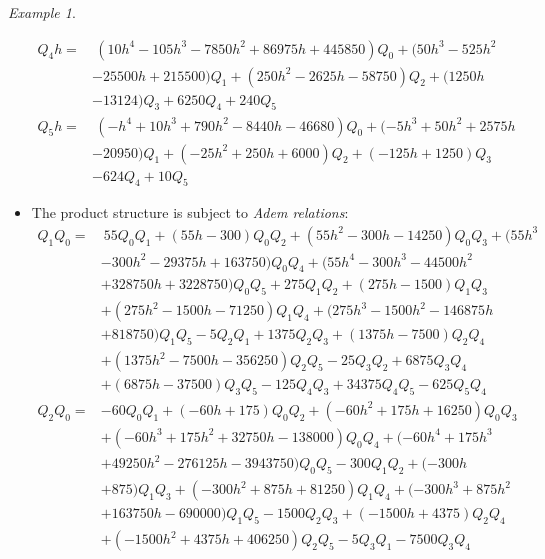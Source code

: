 \documentclass{gtpart}
\theoremstyle{definition}
\theoremstyle{remark}
\newtheorem{ex}[thm]{Example}
\renewcommand{\=}{\approx}
\renewcommand{\-}{\sim}
\numberwithin{equation}{section}
\numberwithin{thm}{section}
\begin{document}
\begin{ex}
\begin{itemize}
\begin{equation*}
\begin{split}
    Q_4 h = & ~ (10 h^4 - 105 h^3 - 7850 h^2 + 86975 h + 445850) Q_0 + (50 h^3 - 525 h^2 \\
            & - 25500 h + 215500) Q_1 + (250 h^2 - 2625 h - 58750) Q_2 + (1250 h \\
            & - 13124) Q_3 + 6250 Q_4 + 240 Q_5 \\
    Q_5 h = & ~ (-h^4 + 10 h^3 + 790 h^2 - 8440 h - 46680) Q_0 + (-5 h^3 + 50 h^2 + 2575 h \\
            & - 20950) Q_1 + (-25 h^2 + 250 h + 6000) Q_2 + (-125 h + 1250) Q_3 \\
            & - 624 Q_4 + 10 Q_5 
   \end{split}
  \end{equation*}

  \item The product structure is subject to {\em Adem relations}: 
  \begin{equation*}
   \begin{split}
    Q_1 Q_0 = & ~ 55 Q_0 Q_1 + (55 h - 300) Q_0 Q_2 + (55 h^2 - 300 h - 14250) Q_0 Q_3 + (55 h^3 \\
              & - 300 h^2 - 29375 h + 163750) Q_0 Q_4 + (55 h^4 - 300 h^3 - 44500 h^2 \\
              & + 328750 h + 3228750) Q_0 Q_5 + 275 Q_1 Q_2 + (275 h - 1500) Q_1 Q_3 \\
              & + (275 h^2 - 1500 h - 71250) Q_1 Q_4 + (275 h^3 - 1500 h^2 - 146875 h \\
              & + 818750) Q_1 Q_5 - 5 Q_2 Q_1 + 1375 Q_2 Q_3 + (1375 h - 7500) Q_2 Q_4 \\
              & + (1375 h^2 - 7500 h - 356250) Q_2 Q_5 - 25 Q_3 Q_2 + 6875 Q_3 Q_4 \\
              & + (6875 h - 37500) Q_3 Q_5 - 125 Q_4 Q_3 + 34375 Q_4 Q_5 - 625 Q_5 Q_4 \\
    Q_2 Q_0 = & -60 Q_0 Q_1 + (-60 h + 175) Q_0 Q_2 + (-60 h^2 + 175 h + 16250) Q_0 Q_3 \\
              & + (-60 h^3 + 175 h^2 + 32750 h - 138000) Q_0 Q_4 + (-60 h^4 + 175 h^3 \\
              & + 49250 h^2 - 276125 h - 3943750) Q_0 Q_5 - 300 Q_1 Q_2 + (-300 h \\
              & + 875) Q_1 Q_3 + (-300 h^2 + 875 h + 81250) Q_1 Q_4 + (-300 h^3 + 875 h^2 \\
              & + 163750 h - 690000) Q_1 Q_5 - 1500 Q_2 Q_3 + (-1500 h + 4375) Q_2 Q_4 \\
              & + (-1500 h^2 + 4375 h + 406250) Q_2 Q_5 - 5 Q_3 Q_1 - 7500 Q_3 Q_4 \\

\end{split}
\end{equation*}
\end{itemize}
\end{ex}
\end{document}
